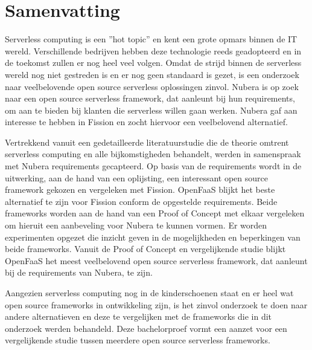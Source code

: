 
%
%

%
\chapter*{Samenvatting}
Serverless computing is een ''hot topic'' en kent een grote opmars binnen de IT wereld. Verschillende bedrijven hebben deze technologie reeds geadopteerd en in de toekomst zullen er nog heel veel volgen. Omdat de strijd binnen de serverless wereld nog niet gestreden is en er nog geen standaard is gezet, is een onderzoek naar veelbelovende open source serverless oplossingen zinvol. Nubera is op zoek naar een open source serverless framework, dat aanleunt bij hun requirements, om aan te bieden bij klanten die serverless willen gaan werken. Nubera gaf aan interesse te hebben in Fission en zocht hiervoor een veelbelovend alternatief. 

Vertrekkend vanuit een gedetailleerde literatuurstudie die de theorie omtrent serverless computing en alle bijkomstigheden behandelt, werden in samenspraak met Nubera requirements gecapteerd. Op basis van de requirements wordt in de uitwerking, aan de hand van een oplijsting, een interessant open source framework gekozen en vergeleken met Fission. OpenFaaS blijkt het beste alternatief te zijn voor Fission conform de opgestelde requirements. Beide frameworks worden aan de hand van een Proof of Concept met elkaar vergeleken om hieruit een aanbeveling voor Nubera te kunnen vormen. Er worden experimenten opgezet die inzicht geven in de mogelijkheden en beperkingen van beide frameworks.
Vanuit de Proof of Concept en vergelijkende studie blijkt OpenFaaS het meest veelbelovend open source serverless framework, dat aanleunt bij de requirements van Nubera, te zijn.

Aangezien serverless computing nog in de kinderschoenen staat en er heel wat open source frameworks in ontwikkeling zijn, is het zinvol onderzoek te doen naar andere alternatieven en deze te vergelijken met de frameworks die in dit onderzoek werden behandeld. Deze bachelorproef vormt een aanzet voor een vergelijkende studie tussen meerdere open source serverless frameworks.
